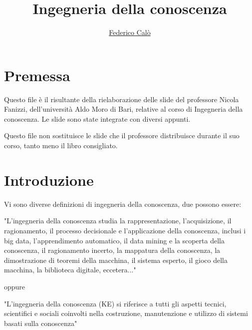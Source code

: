 \documentclass[a4paper]{extarticle}
\title{Ingegneria della conoscenza}
\author{\href{http://www.federicocalo.dev}{Federico Calò} }
\date{}
\begin{document}
\maketitle
\newpage
\tableofcontents
\voffset -30pt

\newpage

\section*{Premessa}

Questo file è il risultante della rielaborazione delle slide del professore Nicola Fanizzi, dell'università Aldo Moro di Bari, relative al corso di Ingegneria della conoscenza. Le slide sono state integrate con diversi appunti. 

Questo file non sostituisce le slide che il professore distribuisce durante il suo corso, tanto meno il libro consigliato.

\newpage


\section{Introduzione}

Vi sono diverse definizioni di ingegneria della conoscenza, due possono essere:

"L'ingegneria della conoscenza studia la rappresentazione, l'acquisizione, il ragionamento, il processo decisionale e l'applicazione della conoscenza, inclusi i big data, l'apprendimento automatico, il data mining e la scoperta della conoscenza, il ragionamento incerto, la mappatura della conoscenza, la dimostrazione di teoremi della macchina, il sistema esperto, il gioco della macchina, la biblioteca digitale, eccetera..."

oppure

"L'ingegneria della conoscenza (KE) si riferisce a tutti gli aspetti tecnici, scientifici e sociali coinvolti nella costruzione, manutenzione e utilizzo di sistemi basati sulla conoscenza"
\end{document}

